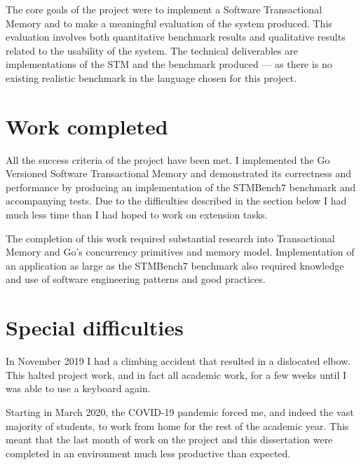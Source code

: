 \documentclass[12pt,a4paper,oneside,openright]{report}
\begin{document}
The core goals of the project were to implement a Software
Transactional Memory and to make a meaningful evaluation of the system
produced. This evaluation involves both quantitative benchmark results
and qualitative results related to the usability of the system. The
technical deliverables are implementations of the STM and the
benchmark produced --- as there is no existing realistic benchmark in
the language chosen for this project.

\vspace{-0.1in}

\section*{Work completed}

All the success criteria of the project have been met. I implemented
the Go Versioned Software Transactional Memory and demonstrated its
correctness and performance by producing an implementation of the
STMBench7 benchmark and accompanying tests. Due to the difficulties
described in the section below I had much less time than I had hoped
to work on extension tasks.

The completion of this work required substantial research into
Transactional Memory and Go's concurrency primitives and memory
model. Implementation of an application as large as the STMBench7
benchmark also required knowledge and use of software engineering
patterns and good practices.

\vspace{-0.1in}

\section*{Special difficulties}

In November 2019 I had a climbing accident that resulted in a
dislocated elbow. This halted project work, and in fact all academic
work, for a few weeks until I was able to use a keyboard again.

Starting in March 2020, the COVID-19 pandemic forced me, and indeed
the vast majority of students, to work from home for the rest of the
academic year. This meant that the last month of work on the project
and this dissertation were completed in an environment much less
productive than expected.

\newpage

\pagestyle{plain} 

\tableofcontents
\end{document}
